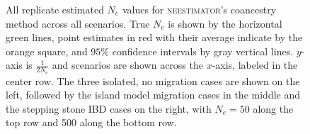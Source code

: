 \begin{landscape}
\begin{figure}[ht]
\centering
{}
\caption[ ~~~ - All replicate estimated $N_e$ values for \textsc{neestimator}'s coancestry method across all scenarios.]{All replicate estimated $N_e$ values for \textsc{neestimator}'s coancestry method across all scenarios. True $N_e$ is shown by the horizontal green lines, point estimates in red with their average indicate by the orange square, and $95\%$ confidence intervals by gray vertical lines. $y$-axis is $\frac{1}{2 N_e}$ and scenarios are shown across the $x$-axis, labeled in the center row. The three isolated, no migration cases are shown on the left, followed by the island model migration cases in the middle and the stepping stone IBD cases on the right, with $N_e = 50$ along the top row and 500 along the bottom row.}
\label{fig:supp_coan}
\end{figure}



\end{landscape}
